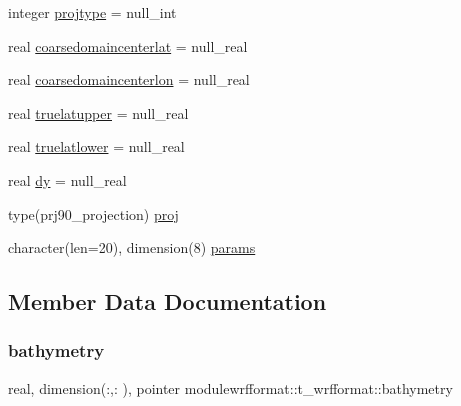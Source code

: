 \begin{DoxyCompactItemize}
integer \mbox{\hyperlink{structmodulewrfformat_1_1t__wrfformat_a40d2c53112db22984707282cae281f96}{projtype}} = null\+\_\+int
\item 
real \mbox{\hyperlink{structmodulewrfformat_1_1t__wrfformat_a07eb63d608b624c30d0685fdc42aa99c}{coarsedomaincenterlat}} = null\+\_\+real
\item 
real \mbox{\hyperlink{structmodulewrfformat_1_1t__wrfformat_aba77bd86108a805f3f482d501700ca66}{coarsedomaincenterlon}} = null\+\_\+real
\item 
real \mbox{\hyperlink{structmodulewrfformat_1_1t__wrfformat_aa5b496e68d4b45d3e3cdab160df32265}{truelatupper}} = null\+\_\+real
\item 
real \mbox{\hyperlink{structmodulewrfformat_1_1t__wrfformat_a0f9351963f5e4186caae505970e3bd7c}{truelatlower}} = null\+\_\+real
\item 
real \mbox{\hyperlink{structmodulewrfformat_1_1t__wrfformat_a78bfcd12790aeef7be5ecb511ab6d199}{dy}} = null\+\_\+real
\item 
type(prj90\+\_\+projection) \mbox{\hyperlink{structmodulewrfformat_1_1t__wrfformat_a30057f9e74c4bfec09f9eb83fa455704}{proj}}
\item 
character(len=20), dimension(8) \mbox{\hyperlink{structmodulewrfformat_1_1t__wrfformat_a748b402078bd09ea5c36f6e7d28d3ca4}{params}}
\end{DoxyCompactItemize}


\subsection{Member Data Documentation}
\mbox{\label{structmodulewrfformat_1_1t__wrfformat_ad9e539808c4addaaa994bf4ea95ce393}} 
\subsubsection{\texorpdfstring{bathymetry}{bathymetry}}
{\footnotesize\ttfamily real, dimension(\+:,\+:  ), pointer modulewrfformat\+::t\+\_\+wrfformat\+::bathymetry\hspace{0.3cm}{\ttfamily [private]}}

\mbox{\label{structmodulewrfformat_1_1t__wrfformat_aed1a1b70da29bc4e9375cd0689ec5fc5}} 
